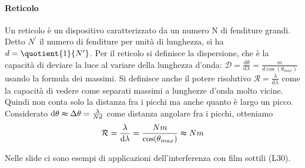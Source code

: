 \paragraph{Reticolo}
Un reticolo è un dispositivo caratterizzato da un numero N di fenditure grandi. Detto \(N^{\prime} \) il numero di fenditure per unità di lunghezza, si ha \(d= \quotient{1}{N^{\prime} } \). Per il reticolo si definisce la dispersione, che è la capacità di deviare la luce al variare della lunghezza d'onda: \(\mathcal{D} = \frac{\mathrm{d}\theta }{\mathrm{d} \lambda } = \frac{m}{d \cos (\theta_{max})} \) usando la formula dei massimi. Si definisce anche il potere risolutivo \(\mathcal{R} =\frac{\lambda }{\mathrm{d}\lambda } \) come la capacità di vedere come separati massimi a lunghezze d'onda molto vicine. Quindi non conta solo la distanza fra i picchi ma anche quanto è largo un picco. Considerato \(\mathrm{d} \theta \thickapprox \Delta \theta = \frac{\lambda }{N d}\) come distanza angolare fra i picchi, otteniamo
\begin{equation}
	\mathcal{R} = \frac{\lambda }{\mathrm{d} \lambda } = \frac{Nm}{\cos (\theta_{max})} \thickapprox Nm
\end{equation}

\begin{note}
	Nelle slide ci sono esempi di applicazioni dell'interferenza con film sottili (L30).
\end{note}

